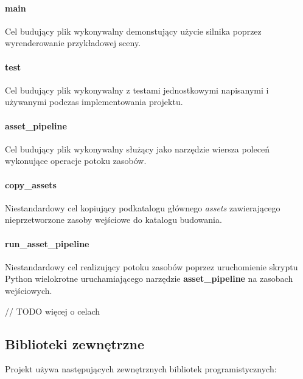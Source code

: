 \paragraph{main} Cel budujący plik wykonywalny demonstujący użycie silnika poprzez wyrenderowanie przykładowej sceny.

\paragraph{test} Cel budujący plik wykonywalny z testami jednostkowymi napisanymi i używanymi podczas implementowania projektu.

\paragraph{asset\_pipeline} Cel budujący plik wykonywalny służący jako narzędzie wiersza poleceń wykonujące operacje potoku zasobów.

\paragraph{copy\_assets} Niestandardowy cel kopiujący podkatalogu głównego \textit{assets} zawierającego nieprzetworzone zasoby wejściowe do katalogu budowania.

\paragraph{run\_asset\_pipeline} Niestandardowy cel realizujący potoku zasobów poprzez uruchomienie skryptu Python wielokrotne uruchamiającego narzędzie \textbf{asset\_pipeline} na zasobach wejściowych.

// TODO więcej o celach

\subsection{Biblioteki zewnętrzne}

Projekt używa następujących zewnętrznych bibliotek programistycznych:

